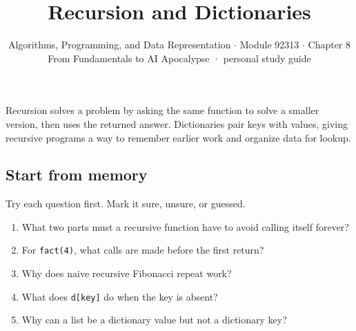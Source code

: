 \documentclass[11pt]{article}
\title{\sffamily\bfseries\color{FAUblue}Recursion and Dictionaries}
\author{Algorithms, Programming, and Data Representation \ensuremath{\cdot} Module 92313 \ensuremath{\cdot} Chapter 8\\[2pt]\small From Fundamentals to AI Apocalypse · personal study guide}
\date{}
\begin{document}
\maketitle
\begingroup\footnotesize\setlength{\parskip}{0pt}\tableofcontents\endgroup
\clearpage

{\large Recursion solves a problem by asking the same function to solve a smaller version, then uses the returned answer. Dictionaries pair keys with values, giving recursive programs a way to remember earlier work and organize data for lookup.}


\begin{keepsection}
\section{Start from memory}

Try each question first. Mark it sure, unsure, or guessed.

\begin{enumerate}
\item What two parts must a recursive function have to avoid calling itself forever?
\item For \texttt{fact(4)}, what calls are made before the first return?
\item Why does naive recursive Fibonacci repeat work?
\item What does \texttt{d[key]} do when the key is absent?
\item Why can a list be a dictionary value but not a dictionary key?
\end{enumerate}

\end{keepsection}
\end{document}
